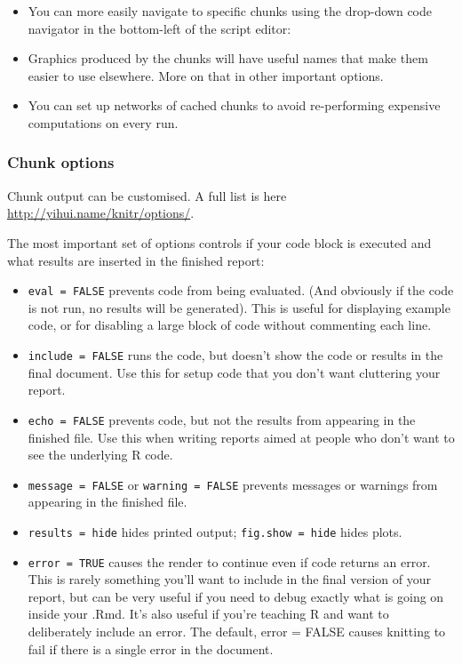 \documentclass[
]{article}
\begin{document}
\begin{itemize}
\item
  You can more easily navigate to specific chunks using the drop-down
  code navigator in the bottom-left of the script editor:
\item
  Graphics produced by the chunks will have useful names that make them
  easier to use elsewhere. More on that in other important options.
\item
  You can set up networks of cached chunks to avoid re-performing
  expensive computations on every run.
\end{itemize}

\hypertarget{chunk-options}{%
\subsubsection{Chunk options}\label{chunk-options}}

Chunk output can be customised. A full list is here
\url{http://yihui.name/knitr/options/}.

The most important set of options controls if your code block is
executed and what results are inserted in the finished report:

\begin{itemize}
\item
  \texttt{eval\ =\ FALSE} prevents code from being evaluated. (And
  obviously if the code is not run, no results will be generated). This
  is useful for displaying example code, or for disabling a large block
  of code without commenting each line.
\item
  \texttt{include\ =\ FALSE} runs the code, but doesn't show the code or
  results in the final document. Use this for setup code that you don't
  want cluttering your report.
\item
  \texttt{echo\ =\ FALSE} prevents code, but not the results from
  appearing in the finished file. Use this when writing reports aimed at
  people who don't want to see the underlying R code.
\item
  \texttt{message\ =\ FALSE} or \texttt{warning\ =\ FALSE} prevents
  messages or warnings from appearing in the finished file.
\item
  \texttt{results\ =\ \textquotesingle{}hide\textquotesingle{}} hides
  printed output;
  \texttt{fig.show\ =\ \textquotesingle{}hide\textquotesingle{}} hides
  plots.
\item
  \texttt{error\ =\ TRUE} causes the render to continue even if code
  returns an error. This is rarely something you'll want to include in
  the final version of your report, but can be very useful if you need
  to debug exactly what is going on inside your .Rmd. It's also useful
  if you're teaching R and want to deliberately include an error. The
  default, error = FALSE causes knitting to fail if there is a single
  error in the document.
\end{itemize}
\end{document}

